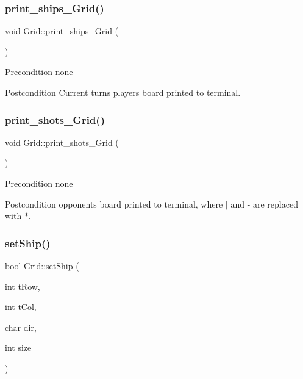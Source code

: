 \subsubsection{\texorpdfstring{print\+\_\+ships\+\_\+\+Grid()}{print\_ships\_Grid()}}
{\footnotesize\ttfamily void Grid\+::print\+\_\+ships\+\_\+\+Grid (\begin{DoxyParamCaption}{ }\end{DoxyParamCaption})}

\begin{DoxyPrecond}{Precondition}
none 
\end{DoxyPrecond}
\begin{DoxyPostcond}{Postcondition}
Current turn\textquotesingle{}s player\textquotesingle{}s board printed to terminal. 
\end{DoxyPostcond}
\mbox{\label{classGrid_afddc50f6f34ad95f4f860c92fb7cf848}} 
\subsubsection{\texorpdfstring{print\+\_\+shots\+\_\+\+Grid()}{print\_shots\_Grid()}}
{\footnotesize\ttfamily void Grid\+::print\+\_\+shots\+\_\+\+Grid (\begin{DoxyParamCaption}{ }\end{DoxyParamCaption})}

\begin{DoxyPrecond}{Precondition}
none 
\end{DoxyPrecond}
\begin{DoxyPostcond}{Postcondition}
opponent\textquotesingle{}s board printed to terminal, where \textquotesingle{}$\vert$\textquotesingle{} and \textquotesingle{}-\/\textquotesingle{} are replaced with \textquotesingle{}$\ast$\textquotesingle{}. 
\end{DoxyPostcond}
\mbox{\label{classGrid_ae1ab8719d4320fce79999814ebd03e18}} 
\subsubsection{\texorpdfstring{set\+Ship()}{setShip()}}
{\footnotesize\ttfamily bool Grid\+::set\+Ship (\begin{DoxyParamCaption}\item[{int}]{t\+Row,  }\item[{int}]{t\+Col,  }\item[{char}]{dir,  }\item[{int}]{size }\end{DoxyParamCaption})}




